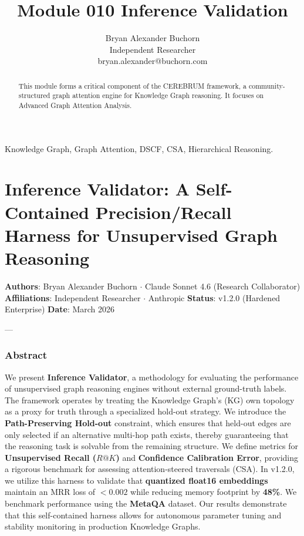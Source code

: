 \documentclass[10pt,journal,compsoc]{IEEEtran}
\begin{document}
\title{Module 010 Inference Validation}
\author{Bryan Alexander Buchorn \\ Independent Researcher \\ bryan.alexander@buchorn.com}

\maketitle

\begin{abstract}
This module forms a critical component of the CEREBRUM framework, a community-structured graph attention engine for Knowledge Graph reasoning. It focuses on Advanced Graph Attention Analysis.
\end{abstract}

\begin{IEEEkeywords}
Knowledge Graph, Graph Attention, DSCF, CSA, Hierarchical Reasoning.
\end{IEEEkeywords}

\section{Inference Validator: A Self-Contained Precision/Recall Harness for Unsupe\-rvised Graph Reasoning}

\textbf{Authors}: Bryan Alexander Buchorn $\cdot$ Claude Sonnet 4.6 (Research Collab\-orator)  
\textbf{Affili\-ations}: Independent Researcher $\cdot$ Anthropic  
\textbf{Status}: v1.2.0 (Hardened Enterprise)  
\textbf{Date}: March 2026

---

\subsubsection{Abstract}
We present \textbf{Inference Validator}, a methodology for evaluating the performance of unsup\-ervised graph reasoning engines without external ground-truth labels. The framework operates by treating the Knowledge Graph's (KG) own topology as a proxy for truth through a specialized hold-out strategy. We introduce the \textbf{Path-Preserving Hold-out} constraint, which ensures that held-out edges are only selected if an alternative multi-hop path exists, thereby guara\-nteeing that the reasoning task is solvable from the remaining structure. We define metrics for \textbf{Unsupe\-rvised Recall ($R@K$)} and \textbf{Confidence Calibration Error}, providing a rigorous benchmark for assessing attention-steered traversals (CSA). In v1.2.0, we utilize this harness to validate that \textbf{quantized float16 embeddings} maintain an MRR loss of $< 0.002$ while reducing memory footprint by \textbf{48\%}. We benchmark performance using the \textbf{MetaQA} \cite{metaqa2017} dataset. Our results demonstrate that this self-contained harness allows for autonomous parameter tuning and stability monitoring in production Knowledge Graphs.
\end{document}
